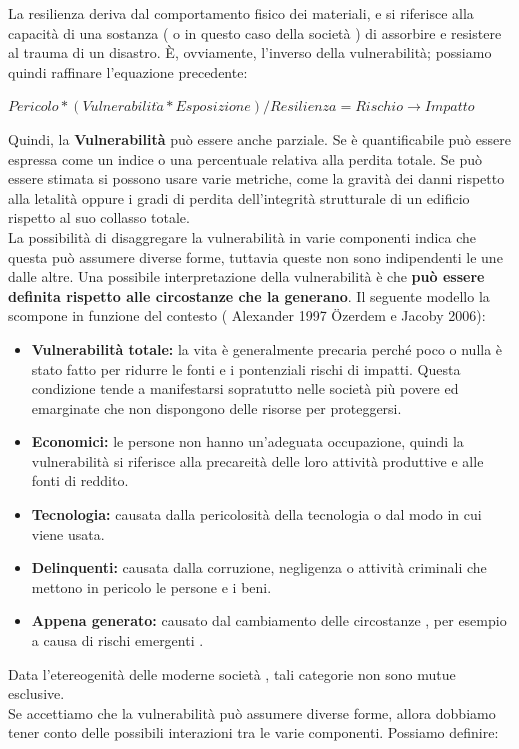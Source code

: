 La resilienza deriva dal comportamento fisico dei materiali, e si riferisce alla capacità di una sostanza ( o in questo caso della società ) di assorbire e resistere al trauma di un disastro. È, ovviamente, l'inverso della vulnerabilità; possiamo quindi raffinare l'equazione precedente: 
\begin{center}
$Pericolo * (Vulnerabilit\grave{a} * Esposizione ) / Resilienza = Rischio \rightarrow Impatto$
\end{center}
Quindi, la \textbf{Vulnerabilità} può essere anche parziale. Se è quantificabile può essere espressa come un indice o una percentuale relativa alla perdita totale. Se può essere stimata si possono usare varie metriche, come la gravità dei danni rispetto alla letalità oppure i gradi di perdita dell'integrità strutturale di un edificio rispetto al suo collasso totale.\\
La possibilità di disaggregare la vulnerabilità in varie componenti indica che questa può assumere diverse forme, tuttavia queste non sono indipendenti le une dalle altre. Una possibile interpretazione della vulnerabilità è che\textbf{ può essere definita rispetto alle circostanze che la generano}. Il seguente modello la scompone in funzione del contesto ( Alexander 1997 Özerdem e Jacoby 2006):
\begin{itemize}
\item \textbf{Vulnerabilità totale:} la vita è generalmente precaria perché poco o nulla è stato fatto per ridurre le fonti e i pontenziali rischi di impatti. Questa condizione tende a manifestarsi sopratutto nelle società più povere ed emarginate che non dispongono delle risorse per proteggersi.
\item \textbf{Economici:} le persone non hanno un'adeguata occupazione, quindi la vulnerabilità si riferisce alla precareità delle loro attività produttive e alle fonti di reddito.
\item \textbf{Tecnologia:} causata dalla pericolosità della tecnologia o dal modo in cui viene usata.
\item \textbf{Delinquenti:} causata dalla corruzione, negligenza o attività criminali che mettono in pericolo le persone e i beni.
\item\textbf{ Appena generato:} causato dal cambiamento delle circostanze , per esempio a causa di rischi emergenti .
\end{itemize}
 Data l'etereogenità delle moderne società , tali categorie non sono mutue esclusive. \\
 Se accettiamo che la vulnerabilità può assumere diverse forme, allora dobbiamo tener conto delle possibili interazioni tra le varie componenti. Possiamo definire:
